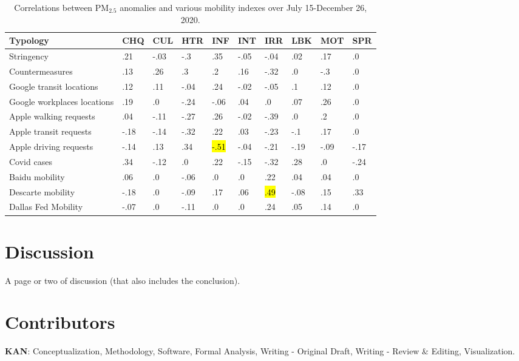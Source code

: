 \documentclass[preprint,12pt]{elsarticle}
\newcommand{\hlo}[2][orange]{{
  \colorlet{foo}{#1}
  \sethlcolor{foo}\hl{#2}}
}
\newcommand{\hlgr}[2][lightgray]{{
  \colorlet{foo}{#1}
  \sethlcolor{foo}\hl{#2}}
}
\begin{document}
\begin{table}[!ht]
\caption{\label{tab:pm25corr3} Correlations between PM$_{2.5}$ anomalies and various mobility indexes over July 15-December 26, 2020.}
    \centering
    \begin{tabular}{|l|p{0.75cm}|p{0.75cm}|p{0.75cm}|p{0.75cm}|p{0.75cm}|p{0.75cm}|p{0.75cm}|p{0.75cm}|p{0.75cm}|}
        \hline
    Typology & CHQ & CUL & HTR & INF & INT & IRR & LBK & MOT & SPR \\ \hline
    Stringency & .21 & -.03 & -.3 & .35 & -.05 & -.04 & .02 & .17 & .0 \\ \hline
     Countermeasures & .13 & .26 & .3 & .2 & .16 & -.32 & .0 & -.3 & .0 \\ \hline
    Google transit locations & .12 & .11 & -.04 & .24 & -.02 & -.05 & .1 & .12 & .0 \\ \hline
    Google workplaces locations & .19 & .0 & -.24 & -.06 & .04 & .0 & .07 & .26 & .0 \\ \hline
    Apple walking requests & .04 & -.11 & -.27 & .26 & -.02 & -.39 & .0 & .2 & .0 \\ \hline
    Apple transit requests & -.18 & -.14 & -.32 & .22 & .03 & -.23 & -.1 & .17 & .0 \\ \hline
    Apple driving requests & -.14 & .13 & .34 & \hlo{-.51} & -.04 & -.21 & -.19 & -.09 & -.17 \\ \hline
    Covid cases & .34 & -.12 & .0 & .22 & -.15 & -.32 & .28 & .0 & -.24 \\ \hline
    Baidu mobility & .06 & .0 & -.06 & .0 & .0 & .22 & .04 & .04 & .0 \\ \hline
    Descarte mobility & -.18 & .0 & -.09 & .17 & .06 & \hlgr{.49} & -.08 & .15 & .33 \\ \hline
    Dallas Fed Mobility & -.07 & .0 & -.11 & .0 & .0 & .24 & .05 & .14 & .0 \\ \hline      
        \end{tabular}
    \end{table}




\section*{Discussion}
A page or two of discussion (that also includes the conclusion).

\section*{Contributors}\label{sec:credit}
\textbf{KAN}: Conceptualization, Methodology, Software, Formal Analysis, Writing - Original Draft, Writing - Review \& Editing, Visualization.
\end{document}
